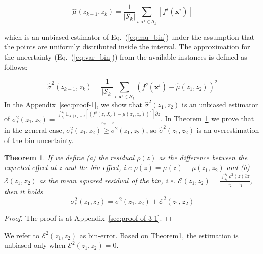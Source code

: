 \documentclass[twoside]{article}
\newtheorem{theorem}{Theorem}[section]
\newcommand{\dfdx}{f^s}
\begin{document}
\begin{equation}
  \label{eq:mu_bin_approx}
  \hat{\mu}(z_{k-1}, z_k) = \frac{1}{|\mathcal{S}_k|}
  \sum_{i:\mathbf{x}^i \in \mathcal{S}_k} \left [ \dfdx(\mathbf{x}^i)
  \right ]
\end{equation}

%
which is an unbiased estimator of Eq.~(\ref{eq:mu_bin}) under the
assumption that the points are uniformly distributed inside the
interval. The approximation for the uncertainty
(Eq.~(\ref{eq:var_bin})) from the available instances is defined as
follows:

%
\begin{equation}
  \label{eq:var_bin_approx}
  \hat{\sigma}^2(z_{k-1}, z_k) = \frac{1}{|\mathcal{S}_k|}
\sum_{i:\mathbf{x}^i \in \mathcal{S}_k} \left ( \dfdx(\mathbf{x}^i) -
  \hat{\mu}(z_1, z_2) \right )^2
\end{equation}
%
In the Appendix~\ref{sec:proof-1}, we show that
\(\hat{\sigma}^2(z_1, z_2)\) is an unbiased estimator of
\(\sigma^2_*(z_1, z_2) = \frac{\int_{z_1}^{z_2} \mathbb{E}_{X_c|X_s=z}
  \left [ (f^s(z, X_c) - \mu(z_1, z_2) )^2 \right] \partial z}{z_2 -
  z_1} \). In Theorem~\ref{sec:theorem-1} we prove that in the general
case, \(\sigma_*^2(z_1, z_2) \geq \sigma^2(z_1, z_2)\), so
\(\hat{\sigma}^2(z_1, z_2)\) is an overestimation of the bin
uncertainty.

\begin{theorem}
  \label{sec:theorem-1}
  If we define (a) the residual \(\rho(z)\) as the difference between
  the expected effect at \(z\) and the bin-effect, i.e
  \(\rho(z) = \mu(z) - \mu(z_1, z_2)\) and (b)
  \(\mathcal{E}(z_1, z_2)\) as the mean squared residual of the bin,
  i.e.
  \(\mathcal{E}(z_1, z_2) = \frac{\int_{z_1}^{z_2}\rho^2(z) \partial
    z}{z_2 - z_1}\), then it holds
\begin{equation}
    \label{eq:bin-uncertainty-proof}
 \sigma_*^2(z_1, z_2) = \sigma^2(z_1, z_2) + \mathcal{E}^2(z_1, z_2)
\end{equation}
  \end{theorem}

\begin{proof}
The proof is at Appendix~\ref{sec:proof-of-3-1}.
\end{proof}

\noindent

We refer to \(\mathcal{E}^2(z_1, z_2)\) as bin-error. Based on
Theorem\ref{sec:theorem-1}, the estimation is unbiased only when
\(\mathcal{E}^2(z_1, z_2) = 0\).
\end{document}
